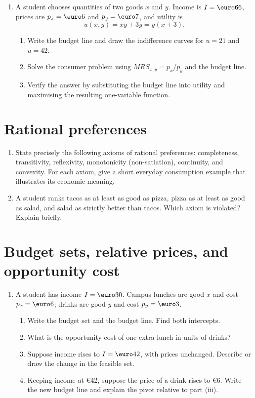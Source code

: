 \documentclass[11pt,a4paper]{article}
\begin{document}
\begin{enumerate}[label=\textbf{4.\alph*}]
  \item A student chooses quantities of two goods \(x\) and \(y\). Income is
  \(I=\text{\euro}66\), prices are \(p_x=\text{\euro}6\) and \(p_y=\text{\euro}7\), and utility is
  \[
    u(x,y)=xy+3y=y(x+3).
  \]
  \begin{enumerate}[label=(\roman*)]
    \item Write the budget line and draw the indifference curves for
    \(u=21\) and \(u=42\).
    \item Solve the consumer problem using \(MRS_{x,y}=p_x/p_y\) and the
    budget line.
    \item Verify the answer by substituting the budget line into utility and
    maximising the resulting one-variable function.
  \end{enumerate}
\end{enumerate}

\section{Rational preferences}

\begin{enumerate}[label=\textbf{5.\alph*}]
  \item State precisely the following axioms of rational preferences:
  completeness, transitivity, reflexivity, monotonicity (non-satiation),
  continuity, and convexity. For each axiom, give a short everyday consumption
  example that illustrates its economic meaning.
  \item A student ranks tacos as at least as good as pizza, pizza as at least
  as good as salad, and salad as strictly better than tacos. Which axiom is
  violated? Explain briefly.
\end{enumerate}

\section{Budget sets, relative prices, and opportunity cost}

\begin{enumerate}[label=\textbf{6.\alph*}]
  \item A student has income \(I=\text{\euro}30\). Campus lunches are good \(x\) and
  cost \(p_x=\text{\euro}6\); drinks are good \(y\) and cost \(p_y=\text{\euro}3\).
  \begin{enumerate}[label=(\roman*)]
    \item Write the budget set and the budget line. Find both intercepts.
    \item What is the opportunity cost of one extra lunch in units of drinks?
    \item Suppose income rises to \(I=\text{\euro}42\), with prices unchanged.
    Describe or draw the change in the feasible set.
    \item Keeping income at \euro42, suppose the price of a drink rises to
    \euro6. Write the new budget line and explain the pivot relative to part
    (iii).
  \end{enumerate}
\end{enumerate}
\end{document}

